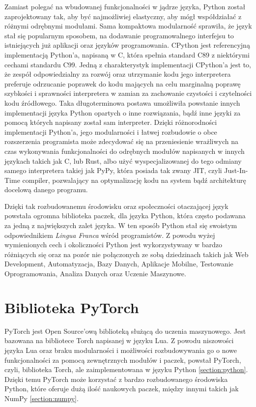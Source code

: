 Zamiast polegać na wbudowanej funkcjonalności w jądrze języka, Python został zaprojektowany tak, aby być najmożliwiej elastyczny, aby mógł współdziałać z różnymi odrębnymi modułami. Sama kompaktowa modularność sprawiła, że język stał się popularnym sposobem, na dodawanie programowalnego interfejsu to istniejących już aplikacji oraz języków programowania.
CPython jest referencyjną implementacją Python'a, napisaną w C, która spełnia standard C89 z niektórymi cechami standardu C99. Jedną z charakterystyk implementacji CPython'a jest to, że zespół odpowiedzialny za rozwój oraz utrzymanie kodu jego interpretera preferuje odrzucanie poprawek do kodu mających na celu marginalną poprawę szybkości i sprawności interpretera w zamian za zachowanie czystości i czytelności kodu źródłowego. Taka długoterminowa postawa umożliwiła powstanie innych implementacji języka Python opartych o inne rozwiązania, bądź inne języki za pomocą których napisany został sam interpreter. Dzięki różnorodności implementacji Python'a, jego modularności i łatwej rozbudowie o obce rozszerzenia programista może zdecydować się na przeniesienie wrażliwych na czas wykonywania funkcjonalności do odrębnych modułów napisanych w innych językach takich jak C, lub Rust, albo użyć wyspecjalizowanej do tego odmiany samego interpretera takiej jak PyPy, która posiada tak zwany JIT, czyli Just-In-Time compiler, pozwalający na optymalizację kodu na system bądź architekturę docelową danego programu.

Dzięki tak rozbudowanemu środowisku oraz społeczności otaczającej język powstała ogromna biblioteka paczek, dla języka Python, która często podawana za jedną z największych zalet języka. W ten sposób Python stał się swoistym odpowiednikiem \textit{Lingua Franca} wśród programistów. Z powodu wyżej wymienionych cech i okoliczności Python jest wykorzystywany w bardzo różniących się oraz na pozór nie połączonych ze sobą dziedzinach takich jak Web Development, Automatyzacja, Bazy Danych, Aplikacje Mobilne, Testowanie Oprogramowania, Analiza Danych oraz Uczenie Maszynowe.



\section{Biblioteka PyTorch}
\label{section:pytorch}
PyTorch \cite{PyTorchWebSite} \cite{DeepLearningWithPyTorch} \cite{ProgrammingPyTorchForDeepLearning} \cite{PyTorchPocketReference} jest Open Source'ową biblioteką służącą do uczenia maszynowego. Jest bazowana na bibliotece Torch napisanej w języku Lua. Z powodu niszowości języka Lua oraz braku modularności i możliwości rozbudowywania go o nowe funkcjonalności za pomocą zewnętrznych modułów i paczek, powstał PyTorch, czyli, biblioteka Torch, ale zaimplementowana w języku Python \ref{section:python}. Dzięki temu PyTorch może korzystać z bardzo rozbudowanego środowiska Python, które oferuje dużą ilość naukowych paczek, między innymi takich jak NumPy \ref{section:numpy}.


